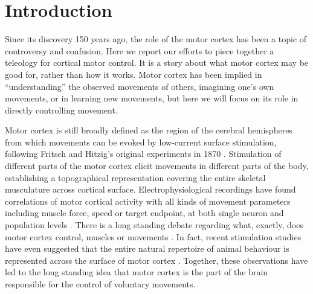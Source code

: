 \section{Introduction}

Since its discovery 150 years ago, the role of the motor cortex has been a topic of controversy and confusion. Here we report our efforts to piece together a teleology for cortical motor control. It is a story about what motor cortex may be good for, rather than how it works. Motor cortex has been implied in ``understanding'' the observed movements of others, imagining one's own movements, or in learning new movements, but here we will focus on its role in directly controlling movement.

Motor cortex is still broadly defined as the region of the cerebral hemispheres from which movements can be evoked by low-current surface stimulation, following Fritsch and Hitzig's original experiments in 1870 \cite{Fritsch1870}. Stimulation of different parts of the motor cortex elicit movements in different parts of the body, establishing a topographical representation covering the entire skeletal musculature across cortical surface. Electrophysiological recordings have found correlations of motor cortical activity with all kinds of movement parameters including muscle force, speed or target endpoint, at both single neuron and population levels \cite{Georgopoulos1986}. There is a long standing debate regarding what, exactly, does motor cortex control, muscles or movements \cite{Todorov2000}. In fact, recent stimulation studies have even suggested that the entire natural repertoire of animal behaviour is represented across the surface of motor cortex \cite{Graziano2002,Aflalo2006}. Together, these observations have led to the long standing idea that motor cortex is the part of the brain responsible for the control of voluntary movements.

